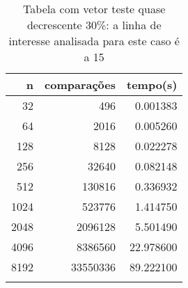 \begin{table}[ht]
\centering
\begin{tabular}{rrr} \toprule
        n &    comparações &       tempo(s) \\ \midrule
      32  &            496 &      0.001383 \\
      64  &           2016 &      0.005260 \\
     128  &           8128 &      0.022278 \\
     256  &          32640 &      0.082148 \\
     512  &         130816 &      0.336932 \\
    1024  &         523776 &      1.414750 \\
    2048  &        2096128 &      5.501490 \\
    4096  &        8386560 &     22.978600 \\
    8192  &       33550336 &     89.222100 \\
\bottomrule\addlinespace
\end{tabular}
\caption{Tabela com vetor teste quase decrescente 30\%: a linha de interesse analisada para este caso é a 15}
\label{tab:bolhaQuaseDecresc30}
\end{table}
